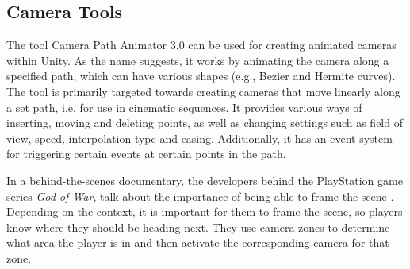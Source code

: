 \subsection{Camera Tools}
The tool Camera Path Animator 3.0 \cite{unity_camTool} can be used for creating animated cameras within Unity. As the name suggests, it works by animating the camera along a specified path, which can have various shapes (e.g., Bezier and Hermite curves). The tool is primarily targeted towards creating cameras that move linearly along a set path, i.e. for use in cinematic sequences. It provides various ways of inserting, moving and deleting points, as well as changing settings such as field of view, speed, interpolation type and easing. Additionally, it has an event system for triggering certain events at certain points in the path.




In a behind-the-scenes documentary, the developers behind the PlayStation game series \textit{God of War}, talk about the importance of being able to frame the scene \cite{gow_camera}. Depending on the context, it is important for them to frame the scene, so players know where they should be heading next. They use camera zones to determine what area the player is in and then activate the corresponding camera for that zone.



